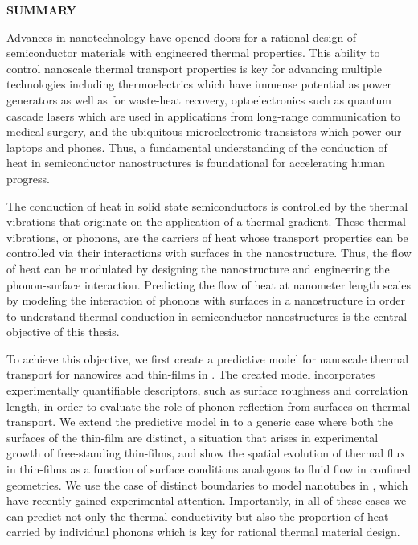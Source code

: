 \clearpage
\thispagestyle{empty}
\begin{centering}
\textbf{SUMMARY}\\
\vspace{\baselineskip}
\end{centering}

Advances in nanotechnology have opened doors for a rational design of semiconductor materials with engineered thermal properties. This ability to control nanoscale thermal transport properties is key for advancing multiple technologies including thermoelectrics which have immense potential as power generators as well as for waste-heat recovery, optoelectronics such as quantum cascade lasers which are used in applications from long-range communication to medical surgery, and the ubiquitous microelectronic transistors which power our laptops and phones. Thus, a fundamental understanding of the conduction of heat in semiconductor nanostructures is foundational for accelerating human progress.

The conduction of heat in solid state semiconductors is controlled by the thermal vibrations that originate on the application of a thermal gradient. These thermal vibrations, or phonons, are the carriers of heat whose transport properties can be controlled via their interactions with surfaces in the nanostructure. Thus, the flow of heat can be modulated by designing the nanostructure and engineering the phonon-surface interaction. Predicting the flow of heat at nanometer length scales by modeling the interaction of phonons with surfaces in a nanostructure in order to understand thermal conduction in semiconductor nanostructures is the central objective of this thesis. 

To achieve this objective, we first create a predictive model for nanoscale thermal transport for nanowires and thin-films in . The created model incorporates experimentally quantifiable descriptors, such as surface roughness and correlation length, in order to evaluate the role of phonon reflection from surfaces on thermal transport. We extend the predictive model in  to a  generic case where both the surfaces of the thin-film are distinct, a situation that arises in experimental growth of free-standing thin-films, and show the  spatial evolution of thermal flux in thin-films as a function of surface conditions analogous to fluid flow in confined geometries. We use the case of distinct boundaries to model nanotubes in , which have recently gained experimental attention. Importantly, in all of these cases we can predict not only the thermal conductivity but also the proportion of heat carried by individual phonons which is key for rational thermal material design.

